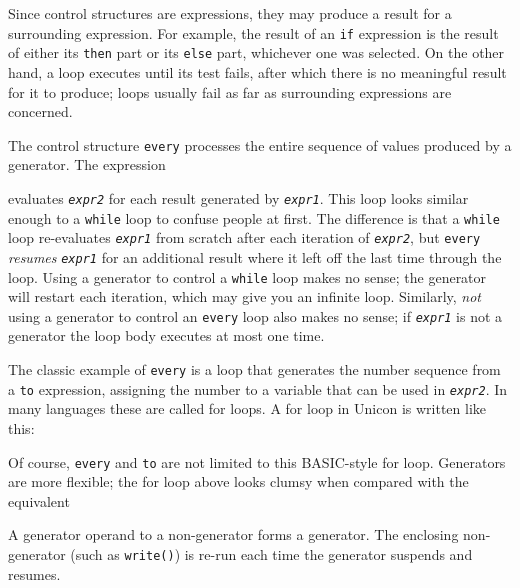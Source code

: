 Since control structures are expressions, they may produce a result
for a surrounding expression. For example, the
result of an \texttt{if} expression is the result of either its
\texttt{then} part or its \texttt{else} part, whichever one was
selected. On the other hand, a loop executes until its test fails,
after which there is no meaningful result for it to produce; loops
usually fail as far as surrounding expressions are concerned.

The control structure
\texttt{every} processes the entire
sequence of values produced by a generator. The expression 


\noindent
evaluates \texttt{\textit{expr2}} for each result generated by
\texttt{\textit{expr1}}. This loop looks similar enough to a
\texttt{while} loop to confuse people at first. The difference is that
a \texttt{while} loop re-evaluates \texttt{\textit{expr1}} from scratch
after each iteration of \texttt{\textit{expr2}}, but \texttt{every}
\textit{resumes} \texttt{\textit{expr1}} for an additional result where
it left off the last time through the loop. Using a generator to
control a \texttt{while} loop makes no sense; the generator will
restart each iteration, which may give you an infinite loop. Similarly,
\textit{not} using a generator to control an \texttt{every} loop also
makes no sense; if \texttt{\textit{expr1}} is not a generator the loop
body executes at most one time.

The classic example of \texttt{every} is a loop that generates the
number sequence from a \texttt{to} expression, assigning the number to
a variable that can be used in \texttt{\textit{expr2}}. In many
languages these are called {\textquotedbl}for{\textquotedbl} loops. A
for loop in Unicon is written like this:


\noindent
Of course, \texttt{every} and \texttt{to} are not limited to this BASIC-style
for loop. Generators are more flexible; the for loop
above looks clumsy when compared with the equivalent


\noindent
A generator operand to a non-generator forms a generator. The enclosing
non-generator (such as \texttt{write()}) is re-run each time
the generator suspends and resumes.

